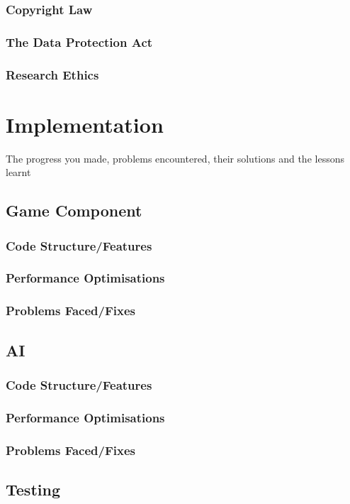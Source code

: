 \documentclass[runningheads,a4paper]{llncs}
\begin{document}
		\subsubsection{Copyright Law}
		\subsubsection{The Data Protection Act}
		\subsubsection{Research Ethics}

\section{Implementation}
The progress you made, problems encountered, their solutions and the lessons learnt

	\subsection{Game Component}
		\subsubsection{Code Structure/Features}
		\subsubsection{Performance Optimisations}
		\subsubsection{Problems Faced/Fixes}
	\subsection{AI}
		\subsubsection{Code Structure/Features}
		\subsubsection{Performance Optimisations}
		\subsubsection{Problems Faced/Fixes}
	\subsection{Testing}
\end{document}
